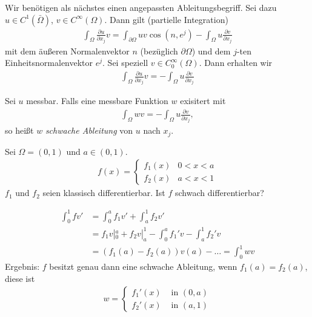 Wir benötigen als nächstes einen angepassten Ableitungsbegriff. Sei dazu $u \in C^1(\bar \Omega)$, $v \in C^\infty(\Omega)$. Dann gilt (partielle Integration)
\begin{align*}
  \int_\Omega \frac{\partial u}{\partial x_j} v = \int_{\partial \Omega}u v \cos (n, e^j)- \int_\Omega u \frac{\partial v}{\partial x_j}
\end{align*}
mit dem äußeren Normalenvektor $n$ (bezüglich $\partial \Omega$) und dem $j$-ten Einheitsnormalenvektor $e^j$. 
Sei speziell $v \in C^\infty_0 (\Omega)$. Dann erhalten wir 
\begin{align*}
  \int_\Omega \frac{\partial u}{\partial x_j} v = -\int_\Omega u \frac{\partial v}{\partial x_j}
\end{align*}

\begin{definition}
  Sei $u$ messbar. Falls eine messbare Funktion $w$ exisitert mit 
  \begin{align*}
    \int_\Omega w v = - \int_\Omega u \frac{\partial v}{ \partial x_j},
  \end{align*}
so heißt $w$ \emph{schwache Ableitung} von $u$ nach $x_j$.
\end{definition}

\begin{beispiel}
  Sei $\Omega = (0,1)$ und $a \in (0,1)$.
  \begin{align*}
    f(x) =
    \begin{cases}
       f_1(x) &0<x<a \\
       f_2(x) &a<x<1
    \end{cases}
  \end{align*}
$f_1$ und $f_2$ seien klassisch differentierbar. Ist $f$ schwach differentierbar?

\begin{align*}
  \int_0^1 f v' &= \int_0^a f_1 v' + \int_a^1 f_2 v'\\ 
&= f_1 v |_0^a + f_2 v |_a^1 - \int_0^a f_1'v - \int_a^1 f_2'v \\
&=(f_1(a)-f_2(a))v(a)- \dots = \int_0^1 wv
\end{align*}
Ergebnis: $f$ besitzt genau dann eine schwache Ableitung, wenn $f_1(a)= f_2(a)$, diese ist 
\begin{align*}
    w =
    \begin{cases}
       f_1'(x) &\text{ in } (0,a) \\
       f_2'(x) &\text{ in } (a,1)
    \end{cases}  
\end{align*}
\end{beispiel}

